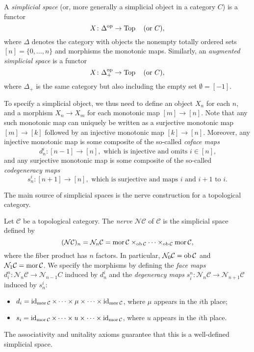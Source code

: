 \documentclass[a4paper,openany]{scrbook}
\renewcommand{\C}{\mathcal C}
\newcommand{\nerve}{\mathcal N}
\begin{document}
\begin{defn}
A \emph{simplicial space} (or, more generally a simplicial object in a category $C$) is a functor
\[
X\colon \Delta^{\operatorname{op}} \to \operatorname{Top} \quad \text{(or $C$)},
\]
where $\Delta$ denotes the category with objects the nonempty totally ordered sets $[n] = \{0,\dots,n\}$ and morphisms the monotonic maps. Similarly, an \emph{augmented simplicial space} is a functor
\[
X\colon \Delta^{\operatorname{op}}_+ \to \operatorname{Top} \quad \text{(or $C$)},
\]
where $\Delta_+$ is the same category but also including the empty set $\emptyset = [-1]$.
\end{defn}

To specify a simplicial object, we thus need to define an object $X_n$ for each $n$, and a morphism $X_n \to X_m$ for each monotonic map $[m] \to [n]$. Note that any such monotonic map can uniquely be written as a surjective monotonic map $[m] \to [k]$ followed by an injective monotonic map $[k] \to [n]$. Moreover, any injective monotonic map is some composite of the so-called \emph{coface maps}
\[
d^i_n\colon [n-1] \to [n], \text{ which is injective and omits $i \in [n]$,}
\]
and any surjective monotonic map is some composite of the so-called \emph{codegeneracy maps}
\[
s^i_n\colon [n+1] \to [n], \text{ which is surjective and maps $i$ and $i+1$ to $i$.}
\]

The main source of simplicial spaces is the nerve construction for a topological category.


\begin{defn}
Let $\C$ be a topological category. The \emph{nerve} $\nerve\C$ of $\C$ is the simplicial space defined by
\[
(\nerve\C)_n = \nerve_n\C = \mor \C \times_{\ob \C} \cdots \times_{\ob \C} \mor\C,
\]
where the fiber product has $n$ factors. In particular, $\nerve_0 \C = \ob \C$ and $\nerve_1 \C = \mor \C$. We specify the morphisms by defining the \emph{face maps} $d_i^n\colon \nerve_n \C \to \nerve_{n-1} C$ induced by $d^i_n$ and the \emph{degeneracy maps} $s_i^n\colon \nerve_n \C \to \nerve_{n+1} \C$ induced by $s^i_n$:
\begin{itemize}
\item $d_i = \id_{\mor \C} \times \cdots \times \mu \times \cdots \times \id_{\mor \C}$, where $\mu$ appears in the $i$th place;
\item $s_i = \id_{\mor \C} \times \cdots \times u \times \cdots \times \id_{\mor \C}$, where $u$ appears in the $i$th place.
\end{itemize}
The associativity and unitality axioms guarantee that this is a well-defined simplicial space.
\end{defn}
\end{document}
